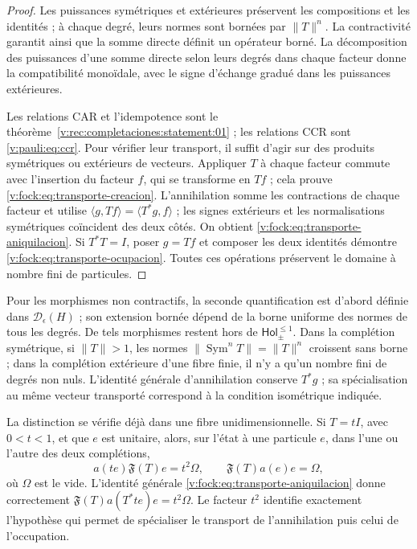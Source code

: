 \begin{proof}
Les puissances symétriques et extérieures préservent les compositions et les identités ;
à chaque degré, leurs normes sont bornées par \(\|T\|^n\). La contractivité
garantit ainsi que la somme directe définit un opérateur borné. La
décomposition des puissances d’une somme directe selon leurs degrés dans chaque
facteur donne la compatibilité monoïdale, avec le signe d’échange gradué
dans les puissances extérieures.

Les relations CAR et l’idempotence sont le
théorème~\ref{v:rec:completaciones:statement:01} ; les relations CCR sont
\eqref{v:pauli:eq:ccr}. Pour vérifier leur transport, il suffit d’agir sur
des produits symétriques ou extérieurs de vecteurs. Appliquer \(T\) à chaque facteur
commute avec l’insertion du facteur \(f\), qui se transforme en \(Tf\) ;
cela prouve \eqref{v:fock:eq:transporte-creacion}. L’annihilation somme les
contractions de chaque facteur et utilise
\(\langle g,Tf\rangle=\langle T^*g,f\rangle\) ; les signes extérieurs et
les normalisations symétriques coïncident des deux côtés. On obtient
\eqref{v:fock:eq:transporte-aniquilacion}. Si \(T^*T=I\), poser \(g=Tf\)
et composer les deux identités démontre
\eqref{v:fock:eq:transporte-ocupacion}. Toutes ces opérations préservent
le domaine à nombre fini de particules.
\end{proof}

Pour les morphismes non contractifs, la seconde quantification est d’abord définie
dans \(\mathcal D_\epsilon(H)\) ; son extension bornée dépend de la borne
uniforme des normes de tous les degrés. De tels morphismes restent hors
de \(\mathsf{Hol}_{\pm}^{\leq1}\). Dans la complétion symétrique, si
\(\|T\|>1\), les normes \(\|\operatorname{Sym}^nT\|=\|T\|^n\)
croissent sans borne ; dans la complétion extérieure d’une fibre finie, il n’y a
qu’un nombre fini de degrés non nuls. L’identité générale
d’annihilation conserve \(T^*g\) ; sa spécialisation au même vecteur
transporté correspond à la condition isométrique indiquée.

La distinction se vérifie déjà dans une fibre unidimensionnelle. Si
\(T=tI\), avec \(0<t<1\), et que \(e\) est unitaire, alors, sur l’état
à une particule \(e\), dans l’une ou l’autre des deux complétions,
\begin{equation}
 a(te)\mathfrak F(T)e=t^2\Omega,
 \qquad \mathfrak F(T)a(e)e=\Omega,
 \label{v:fock:eq:control-no-isometrico}
\end{equation}
où \(\Omega\) est le vide. L’identité générale
\eqref{v:fock:eq:transporte-aniquilacion} donne correctement
\(\mathfrak F(T)a(T^*te)e=t^2\Omega\). Le facteur \(t^2\) identifie
exactement l’hypothèse qui permet de spécialiser le transport de
l’annihilation puis celui de l’occupation.

